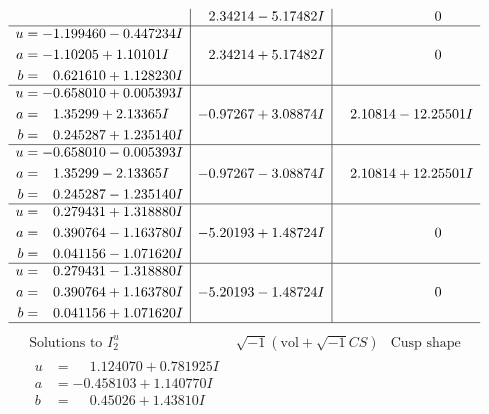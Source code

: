 \documentclass[1p]{elsarticle_modified}
\theoremstyle{definition}
\newcommand{\I}{\sqrt{-1}}
\begin{document}
$$\begin{array}{c|c|c}
 & \phantom{-}2.34214 - 5.17482 I & \phantom{-0.000000 } 0 \\ \hline\begin{aligned}
u &= -1.199460 - 0.447234 I \\
a &= -1.10205 + 1.10101 I \\
b &= \phantom{-}0.621610 + 1.128230 I\end{aligned}
 & \phantom{-}2.34214 + 5.17482 I & \phantom{-0.000000 } 0 \\ \hline\begin{aligned}
u &= -0.658010 + 0.005393 I \\
a &= \phantom{-}1.35299 + 2.13365 I \\
b &= \phantom{-}0.245287 + 1.235140 I\end{aligned}
 & -0.97267 + 3.08874 I & \phantom{-}2.10814 - 12.25501 I \\ \hline\begin{aligned}
u &= -0.658010 - 0.005393 I \\
a &= \phantom{-}1.35299 - 2.13365 I \\
b &= \phantom{-}0.245287 - 1.235140 I\end{aligned}
 & -0.97267 - 3.08874 I & \phantom{-}2.10814 + 12.25501 I \\ \hline\begin{aligned}
u &= \phantom{-}0.279431 + 1.318880 I \\
a &= \phantom{-}0.390764 - 1.163780 I \\
b &= \phantom{-}0.041156 - 1.071620 I\end{aligned}
 & -5.20193 + 1.48724 I & \phantom{-0.000000 } 0 \\ \hline\begin{aligned}
u &= \phantom{-}0.279431 - 1.318880 I \\
a &= \phantom{-}0.390764 + 1.163780 I \\
b &= \phantom{-}0.041156 + 1.071620 I\end{aligned}
 & -5.20193 - 1.48724 I & \phantom{-0.000000 } 0\\
 \hline 
 \end{array}$$\newpage$$\begin{array}{c|c|c}  
\text{Solutions to }I^u_{2}& \I (\text{vol} + \sqrt{-1}CS) & \text{Cusp shape}\\
 \hline 
\begin{aligned}
u &= \phantom{-}1.124070 + 0.781925 I \\
a &= -0.458103 + 1.140770 I \\
b &= \phantom{-}0.45026 + 1.43810 I\end{aligned}

\end{array}$$
\end{document}

